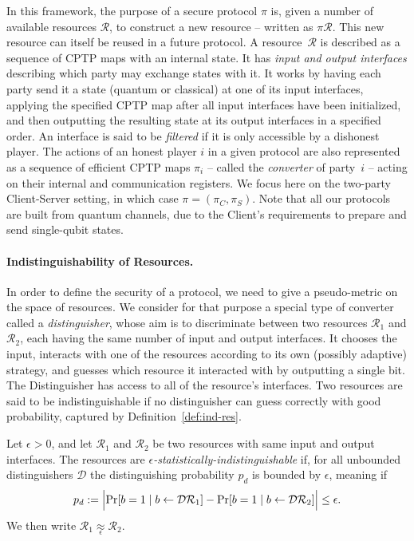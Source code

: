 In this framework, the purpose of a secure protocol $\pi$ is, given a number of available resources $\mathcal{R}$, to construct a new resource -- written as $\pi \mathcal{R}$. This new resource can itself be reused in a future protocol. A resource~$\mathcal{R}$ is described as a sequence of CPTP maps with an internal state. It has \emph{input and output interfaces} describing which party may exchange states with it. It works by having each party send it a state (quantum or classical) at one of its input interfaces, applying the specified CPTP map after all input interfaces have been initialized, and then outputting the resulting state at its output interfaces in a specified order. An interface is said to be \emph{filtered} if it is only accessible by a dishonest player. The actions of an honest player $i$ in a given protocol are also represented as a sequence of efficient CPTP maps $\pi_i$ -- called the \emph{converter} of party~$i$ -- acting on their internal and communication registers. We focus here on the two-party Client-Server setting, in which case $\pi = (\pi_C, \pi_S)$. Note that all our protocols are built from quantum channels, due to the Client's requirements to prepare and send single-qubit states.

\paragraph{Indistinguishability of Resources.}

In order to define the security of a protocol, we need to give a pseudo-metric on the space of resources.  We consider for that purpose a special type of converter called a \emph{distinguisher}, whose aim is to discriminate between two resources $\mathcal{R}_1$ and $\mathcal{R}_2$, each having the same number of input and output interfaces.  It chooses the input, interacts with one of the resources according to its own (possibly adaptive) strategy, and guesses which resource it interacted with by outputting a single bit.  The Distinguisher has access to all of the resource's interfaces. Two resources are said to be indistinguishable if no distinguisher can guess correctly with good probability, captured by Definition~\ref{def:ind-res}.

\begin{definition}
  \label{def:ind-res}
  Let $\epsilon > 0$, and let $\mathcal{R}_1$ and $\mathcal{R}_2$ be two resources with same input and output interfaces.  The resources are \emph{$\epsilon$-statistically-indistinguishable} if, for all unbounded distinguishers $\mathcal{D}$ the distinguishing probability $p_d$ is bounded by $\epsilon$, meaning if
  \begin{equation}
    \label{eq:dist}
    p_d := \Bigl\lvert\Pr[b = 1 \mid b \leftarrow \mathcal{D}\mathcal{R}_1] - \Pr[b = 1 \mid b \leftarrow \mathcal{D}\mathcal{R}_2]\Bigr\rvert \leq \epsilon.
  \end{equation}
  We then write $\mathcal{R}_1 \underset{\epsilon}{\approx} \mathcal{R}_2$.
\end{definition}


